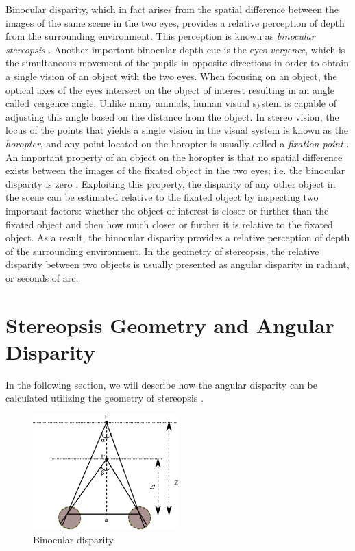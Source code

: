 Binocular disparity, which in fact arises from the spatial difference 
between the images of the same scene in the two eyes, provides a relative perception of depth from the surrounding environment. This perception is known as {\it binocular stereopsis} \cite{how95}. 
Another important binocular depth cue is the eyes {\it vergence}, which is the simultaneous movement of the pupils in opposite directions in order to obtain a single vision of an object with the
two eyes. When focusing on an object, the optical axes of the eyes intersect on the object of interest resulting in an angle called vergence angle. Unlike many animals, human visual system 
is capable of adjusting this angle based on the distance from the object.
In stereo vision, the locus of the points that yields a single vision in the visual system is known as the {\it horopter}, and any point located on the horopter is usually called a 
{\it fixation point} \cite{binr83,how95}.
An important property of an object on the horopter is that no spatial difference
exists between the images of the fixated object in the two eyes; i.e. the binocular disparity is zero \cite{how95}. 
Exploiting this property, the disparity of any other object in the scene can be estimated relative to the fixated object by inspecting two important factors: 
whether the object of interest is closer or further than the fixated object and then how much closer or further it is relative to the fixated object.
As a result, the binocular disparity provides a relative perception of depth of the surrounding environment.
In the geometry of stereopsis, the relative disparity between two objects is usually presented as angular disparity in radiant, or seconds of arc.

\section{Stereopsis Geometry and Angular Disparity}

In the following section, we will describe how the angular disparity can be calculated utilizing the geometry of stereopsis \cite{binr83}.

\begin{figure}[!h]
\centering
\includegraphics[width=0.5\textwidth]{binocular}
\caption{Binocular disparity}
\label{fig:stereopsis}
\end{figure} 


